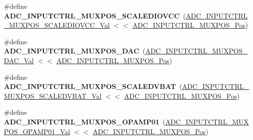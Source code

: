 \begin{DoxyCompactItemize}
\item 
\hypertarget{group___s_a_m_l21___a_d_c_ga79bc3be734d17eee64613b1effca6242}{}\#define {\bfseries A\+D\+C\+\_\+\+I\+N\+P\+U\+T\+C\+T\+R\+L\+\_\+\+M\+U\+X\+P\+O\+S\+\_\+\+S\+C\+A\+L\+E\+D\+I\+O\+V\+C\+C}~(\hyperlink{group___s_a_m_l21___a_d_c_ga3d2c77a183f5a2294d33f2bbc77fa637}{A\+D\+C\+\_\+\+I\+N\+P\+U\+T\+C\+T\+R\+L\+\_\+\+M\+U\+X\+P\+O\+S\+\_\+\+S\+C\+A\+L\+E\+D\+I\+O\+V\+C\+C\+\_\+\+Val} $<$$<$ \hyperlink{group___s_a_m_l21___a_d_c_ga583868be285e1c06c9a93dfd552d8c6a}{A\+D\+C\+\_\+\+I\+N\+P\+U\+T\+C\+T\+R\+L\+\_\+\+M\+U\+X\+P\+O\+S\+\_\+\+Pos})\label{group___s_a_m_l21___a_d_c_ga79bc3be734d17eee64613b1effca6242}

\item 
\hypertarget{group___s_a_m_l21___a_d_c_ga5ca175d514b9f556044908a6cedbe673}{}\#define {\bfseries A\+D\+C\+\_\+\+I\+N\+P\+U\+T\+C\+T\+R\+L\+\_\+\+M\+U\+X\+P\+O\+S\+\_\+\+D\+A\+C}~(\hyperlink{group___s_a_m_l21___a_d_c_ga3dcf66ff42fdb4efc566c4790b431ed9}{A\+D\+C\+\_\+\+I\+N\+P\+U\+T\+C\+T\+R\+L\+\_\+\+M\+U\+X\+P\+O\+S\+\_\+\+D\+A\+C\+\_\+\+Val}  $<$$<$ \hyperlink{group___s_a_m_l21___a_d_c_ga583868be285e1c06c9a93dfd552d8c6a}{A\+D\+C\+\_\+\+I\+N\+P\+U\+T\+C\+T\+R\+L\+\_\+\+M\+U\+X\+P\+O\+S\+\_\+\+Pos})\label{group___s_a_m_l21___a_d_c_ga5ca175d514b9f556044908a6cedbe673}

\item 
\hypertarget{group___s_a_m_l21___a_d_c_ga4ac830bd80dd71627849de116c69dded}{}\#define {\bfseries A\+D\+C\+\_\+\+I\+N\+P\+U\+T\+C\+T\+R\+L\+\_\+\+M\+U\+X\+P\+O\+S\+\_\+\+S\+C\+A\+L\+E\+D\+V\+B\+A\+T}~(\hyperlink{group___s_a_m_l21___a_d_c_gaab9c614fcc1fd111292116ba7f0e049d}{A\+D\+C\+\_\+\+I\+N\+P\+U\+T\+C\+T\+R\+L\+\_\+\+M\+U\+X\+P\+O\+S\+\_\+\+S\+C\+A\+L\+E\+D\+V\+B\+A\+T\+\_\+\+Val} $<$$<$ \hyperlink{group___s_a_m_l21___a_d_c_ga583868be285e1c06c9a93dfd552d8c6a}{A\+D\+C\+\_\+\+I\+N\+P\+U\+T\+C\+T\+R\+L\+\_\+\+M\+U\+X\+P\+O\+S\+\_\+\+Pos})\label{group___s_a_m_l21___a_d_c_ga4ac830bd80dd71627849de116c69dded}

\item 
\hypertarget{group___s_a_m_l21___a_d_c_gaed6e1fc3feb4d93cd518b28a16208505}{}\#define {\bfseries A\+D\+C\+\_\+\+I\+N\+P\+U\+T\+C\+T\+R\+L\+\_\+\+M\+U\+X\+P\+O\+S\+\_\+\+O\+P\+A\+M\+P01}~(\hyperlink{group___s_a_m_l21___a_d_c_gaaf94029e0fc0e6d9515182fedea39774}{A\+D\+C\+\_\+\+I\+N\+P\+U\+T\+C\+T\+R\+L\+\_\+\+M\+U\+X\+P\+O\+S\+\_\+\+O\+P\+A\+M\+P01\+\_\+\+Val} $<$$<$ \hyperlink{group___s_a_m_l21___a_d_c_ga583868be285e1c06c9a93dfd552d8c6a}{A\+D\+C\+\_\+\+I\+N\+P\+U\+T\+C\+T\+R\+L\+\_\+\+M\+U\+X\+P\+O\+S\+\_\+\+Pos})\label{group___s_a_m_l21___a_d_c_gaed6e1fc3feb4d93cd518b28a16208505}


\end{DoxyCompactItemize}
